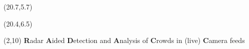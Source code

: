 \documentclass[%
textcolor=radacc_lightBlue,	%
pagecolor=radacc_darkblue,		%
]{../estposter}
\begin{document}
\begin{textblock}{5.4}(20.7,5.7)
\color{radacc_lighterGray}
\begin{center}
\end{center}
\end{textblock}
\begin{textblock}{5.4}(20.4,6.5)
\color{radacc_lighterGray}
\begin{center}
\end{center}
\end{textblock}



\titleblock{\textcolor{radacc_blue}{Bachelor PSE}} %
\begin{textblock}{26}(2,10) 
\color{radacc_blue}
\textbf{R}adar \textbf{A}ided \textbf{D}etection and \textbf{A}nalysis of \textbf{C}rowds in \small{(live)} \textbf{C}amera feeds	%
\end{textblock}



\end{document}
